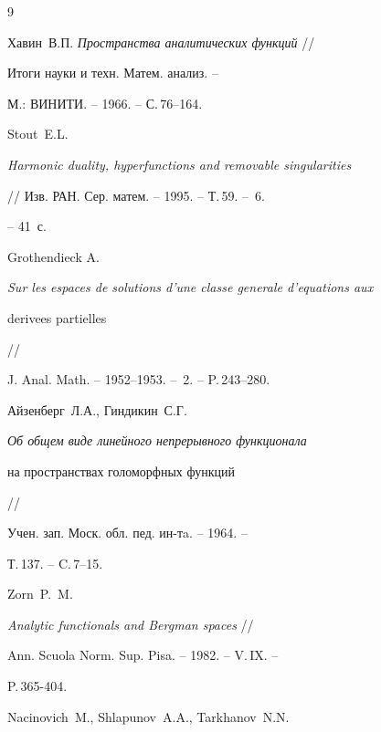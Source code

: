 \begin{thebibliography}{9}







{Хавин~В.П.} {\em Пространства аналитических функций} //


Итоги науки и техн. Матем. анализ. --


М.: ВИНИТИ. -- 1966. -- С.\,76--164.







Stout~E.L.


{\em Harmonic duality, hyperfunctions and removable singularities}


//  Изв. РАН. Сер. матем. -- 1995. -- Т.\,59. -- \No\,6.


-- 41~с.







Grothendieck A.


{\em Sur les espaces de solutions d'une classe generale d'equations aux


derivees partielles} //


{J. Anal. Math.} -- 1952--1953. -- \No\,2. -- P.\,243--280.







{Айзенберг~Л.А., Гиндикин~С.Г.}


{\em Об общем виде линейного непрерывного функционала


на пространствах голоморфных функций} //


{Учен. зап. Моск. обл. пед. ин-тa.} -- 1964. --


Т.\,137. -- C.\,7--15.







Zorn~P.~M.


{\em Analytic functionals and Bergman spaces} //


Ann. Scuola Norm. Sup. Pisa. -- 1982. -- V.\,IX. --


P.\,365-404.







Nacinovich~M., Shlapunov~A.A., Tarkhanov~N.N.



\end{thebibliography}
